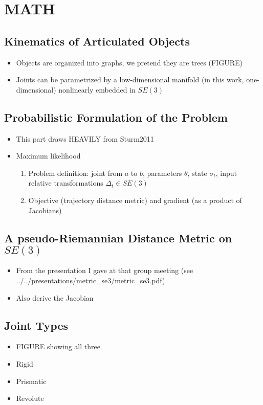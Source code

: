 \documentclass[letterpaper, 10 pt, conference]{ieeeconf}  %
\begin{document}
\section{MATH}

\subsection{Kinematics of Articulated Objects}
    \begin{itemize}
      \item Objects are organized into graphs, we pretend they are trees (FIGURE)
      \item Joints can be parametrized by a low-dimensional manifold (in this work, one-dimensional) nonlinearly embedded in $SE(3)$
    \end{itemize}
\subsection{Probabilistic Formulation of the Problem}
    \begin{itemize}
      \item This part draws HEAVILY from Sturm2011
      \item Maximum likelihood
        \begin{enumerate}
          \item Problem definition: joint from $a$ to $b$, parameters $\theta$, state $\sigma_t$, input relative transformations $\Delta_t \in SE(3)$
          \item Objective (trajectory distance metric) and gradient (as a product of Jacobians)
        \end{enumerate}
    \end{itemize}
\subsection{A pseudo-Riemannian Distance Metric on $SE(3)$}
    \begin{itemize}
      \item From the presentation I gave at that group meeting (see ../../presentations/metric\_se3/metric\_se3.pdf)
      \item Also derive the Jacobian
    \end{itemize}
\subsection{Joint Types}
    \begin{itemize}
      \item FIGURE showing all three
      \item Rigid
      \item Prismatic
      \item Revolute
    \end{itemize}
\end{document}
